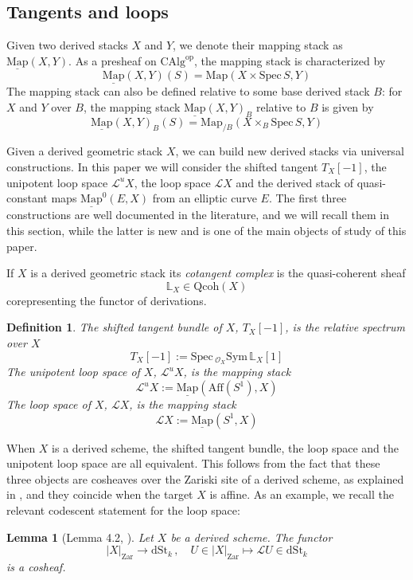 \documentclass[11pt,letterpaper]{amsart}
\newtheorem{lemma}[dummy]{Lemma}
\newtheorem{definition}[dummy]{Definition}
\newcommand{\bL}{\mathbb{L}}
\newcommand{\cO}{\mathcal{O}}
\newcommand{\cL}{\mathcal{L}}
\newcommand{\Map}[2]{\underline{\mathrm{Map}}\left (#1,#2\right )}
\newcommand{\Mapo}[2]{\underline{\mathrm{Map}}^{0}\left (#1,#2\right )}
\newcommand{\op}{\mathrm{op}}
\newcommand{\dSt}{\mathrm{dSt}}
\newcommand{\dStk}{\mathrm{dSt}_{k}}
\newcommand{\Aff}[1]{\mathrm{Aff}(#1)}
\newcommand{\Spec}{\mathrm{S}\mathrm{pec}\,}
\newcommand{\Zar}[1]{|#1|_{\mathrm{Zar}}}
\newcommand{\CAlg}{\mathrm{CAlg}}
\newcommand{\Qcoh}{\mathrm{Qcoh}}
\begin{document}
\subsection{Tangents and loops}\label{subsection:tangents,loops,maps}
Given two derived stacks $X$ and $Y$, we denote their mapping stack as $\Map{X}{Y}$.   %
As a presheaf on $\CAlg^\op$, the mapping stack is characterized by 
\begin{equation*}
\Map{X}{Y}(S)=\mathrm{Map}(X\times\Spec S,Y)
\end{equation*}
The mapping stack can also be defined relative to some base derived stack $B$: for $X$ and $Y$ over $B$, the mapping stack $\Map{X}{Y}_{B}$ relative to $B$ is given by 
\begin{equation*}
\Map{X}{Y}_{B}(S)=\mathrm{Map}_{/B}(X\times_{B}\Spec S,Y)
\end{equation*}

Given a derived geometric stack $X$, we can build new derived stacks via universal constructions. In this paper we will consider the shifted tangent $T_X[-1]$, the unipotent loop space $\cL^u X$, the loop space $\cL X$ and the derived stack of quasi-constant maps $\Mapo{E}{X}$ from an elliptic curve $E$. The first three constructions are well documented in the literature, and we will recall them in this section, while the latter is new and is one of the main objects of study of this paper. 

If $X$ is a derived geometric stack   its \emph{cotangent complex} is the quasi-coherent sheaf $$\bL_X\in\Qcoh(X)$$ corepresenting the functor of derivations. 
\begin{definition}
The \emph{shifted tangent bundle} of $X$, $T_X[-1]$, is the relative spectrum over $X$ $$T_X[-1]:=\Spec_{\cO_X}\mathrm{Sym}\,\bL_X[1]$$
The \emph{unipotent loop space} of $X$, $\cL^u X$, is the mapping stack $$\cL^u X:=\Map{\Aff{S^1}}{X}$$
The \emph{loop space} of $X$, $\cL X$, is the mapping stack $$\cL X:=\Map{S^1}{X}$$
\end{definition}
When $X$ is a derived scheme, the shifted tangent bundle, the loop space and the unipotent loop space are all equivalent. This follows from the fact that these three objects are cosheaves over the Zariski site of a derived scheme, as explained in \cite{BZNLoopConn}, and  they coincide   when the target $X$ is affine. As an example, we recall the relevant codescent statement for the loop space:
\begin{lemma}[Lemma 4.2, \cite{BZNLoopConn}]
Let $X$ be a derived scheme. The functor
$$
\Zar{X}\rightarrow \dStk \, , \quad  
U \in \Zar{X} \mapsto\cL U \in  \dStk
$$
is a cosheaf.
\end{lemma}
\end{document}
